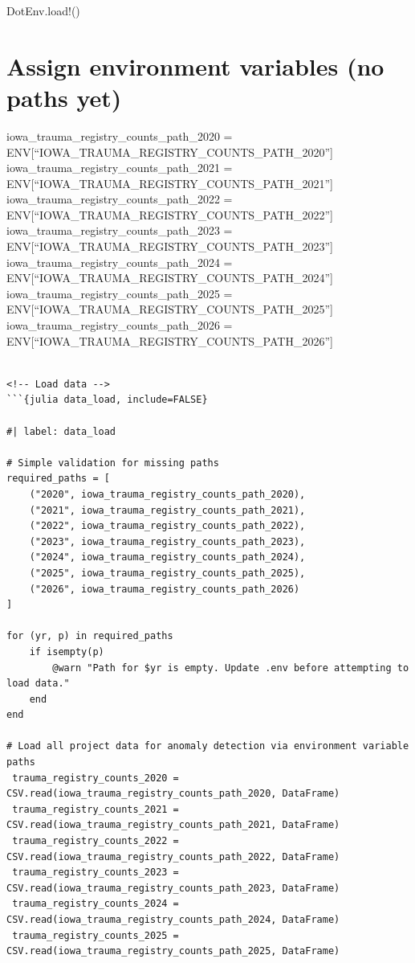 \documentclass[
  12pt,
  letterpaper,
  DIV=11,
  numbers=noendperiod]{scrartcl}
\begin{document}
DotEnv.load!()

\section{Assign environment variables (no paths
yet)}\label{assign-environment-variables-no-paths-yet}

iowa\_trauma\_registry\_counts\_path\_2020 =
ENV{[}``IOWA\_TRAUMA\_REGISTRY\_COUNTS\_PATH\_2020''{]}
iowa\_trauma\_registry\_counts\_path\_2021 =
ENV{[}``IOWA\_TRAUMA\_REGISTRY\_COUNTS\_PATH\_2021''{]}
iowa\_trauma\_registry\_counts\_path\_2022 =
ENV{[}``IOWA\_TRAUMA\_REGISTRY\_COUNTS\_PATH\_2022''{]}
iowa\_trauma\_registry\_counts\_path\_2023 =
ENV{[}``IOWA\_TRAUMA\_REGISTRY\_COUNTS\_PATH\_2023''{]}
iowa\_trauma\_registry\_counts\_path\_2024 =
ENV{[}``IOWA\_TRAUMA\_REGISTRY\_COUNTS\_PATH\_2024''{]}
iowa\_trauma\_registry\_counts\_path\_2025 =
ENV{[}``IOWA\_TRAUMA\_REGISTRY\_COUNTS\_PATH\_2025''{]}
iowa\_trauma\_registry\_counts\_path\_2026 =
ENV{[}``IOWA\_TRAUMA\_REGISTRY\_COUNTS\_PATH\_2026''{]}

\begin{verbatim}

<!-- Load data -->
```{julia data_load, include=FALSE}

#| label: data_load

# Simple validation for missing paths
required_paths = [
    ("2020", iowa_trauma_registry_counts_path_2020),
    ("2021", iowa_trauma_registry_counts_path_2021),
    ("2022", iowa_trauma_registry_counts_path_2022),
    ("2023", iowa_trauma_registry_counts_path_2023),
    ("2024", iowa_trauma_registry_counts_path_2024),
    ("2025", iowa_trauma_registry_counts_path_2025),
    ("2026", iowa_trauma_registry_counts_path_2026)
]

for (yr, p) in required_paths
    if isempty(p)
        @warn "Path for $yr is empty. Update .env before attempting to load data."
    end
end

# Load all project data for anomaly detection via environment variable paths
 trauma_registry_counts_2020 = CSV.read(iowa_trauma_registry_counts_path_2020, DataFrame)
 trauma_registry_counts_2021 = CSV.read(iowa_trauma_registry_counts_path_2021, DataFrame)
 trauma_registry_counts_2022 = CSV.read(iowa_trauma_registry_counts_path_2022, DataFrame)
 trauma_registry_counts_2023 = CSV.read(iowa_trauma_registry_counts_path_2023, DataFrame)
 trauma_registry_counts_2024 = CSV.read(iowa_trauma_registry_counts_path_2024, DataFrame)
 trauma_registry_counts_2025 = CSV.read(iowa_trauma_registry_counts_path_2025, DataFrame)
 
\end{verbatim}
\end{document}

